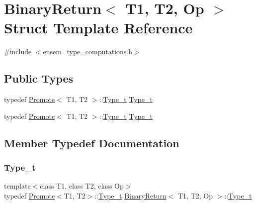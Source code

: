 \hypertarget{structBinaryReturn}{}\section{Binary\+Return$<$ T1, T2, Op $>$ Struct Template Reference}
\label{structBinaryReturn}


{\ttfamily \#include $<$ensem\+\_\+type\+\_\+computations.\+h$>$}

\subsection*{Public Types}
\begin{DoxyCompactItemize}
\item 
typedef \mbox{\hyperlink{structPromote}{Promote}}$<$ T1, T2 $>$\+::\mbox{\hyperlink{structBinaryReturn_a77ba8984fbe3ead3c145da225432d208}{Type\+\_\+t}} \mbox{\hyperlink{structBinaryReturn_a77ba8984fbe3ead3c145da225432d208}{Type\+\_\+t}}
\item 
typedef \mbox{\hyperlink{structPromote}{Promote}}$<$ T1, T2 $>$\+::\mbox{\hyperlink{structBinaryReturn_a77ba8984fbe3ead3c145da225432d208}{Type\+\_\+t}} \mbox{\hyperlink{structBinaryReturn_a77ba8984fbe3ead3c145da225432d208}{Type\+\_\+t}}
\end{DoxyCompactItemize}


\subsection{Member Typedef Documentation}
\mbox{\label{structBinaryReturn_a77ba8984fbe3ead3c145da225432d208}} 
\subsubsection{\texorpdfstring{Type\_t}{Type\_t}\hspace{0.1cm}{\footnotesize\ttfamily [1/2]}}
{\footnotesize\ttfamily template$<$class T1, class T2, class Op$>$ \\
typedef \mbox{\hyperlink{structPromote}{Promote}}$<$T1, T2$>$\+::\mbox{\hyperlink{structBinaryReturn_a77ba8984fbe3ead3c145da225432d208}{Type\+\_\+t}} \mbox{\hyperlink{structBinaryReturn}{Binary\+Return}}$<$ T1, T2, Op $>$\+::\mbox{\hyperlink{structBinaryReturn_a77ba8984fbe3ead3c145da225432d208}{Type\+\_\+t}}}

